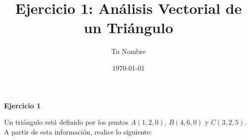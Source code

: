 \documentclass{article}
\title{\Large \textbf{Ejercicio 1: Análisis Vectorial de un Triángulo}}
\author{Tu Nombre}
\date{\today}
\begin{document}
\maketitle

\begin{center}
\colorbox{gray!10}{\parbox{0.95\textwidth}{
\vspace{0.3cm}
\centering
\textbf{\large Ejercicio 1}
\vspace{0.2cm}

\begin{minipage}{0.9\textwidth}
Un triángulo está definido por los puntos $A(1,2,0)$, $B(4,6,0)$ y $C(3,2,5)$. A partir de esta información, realice lo siguiente:
\end{minipage}
\vspace{0.3cm}
}}
\end{center}
\end{document}
